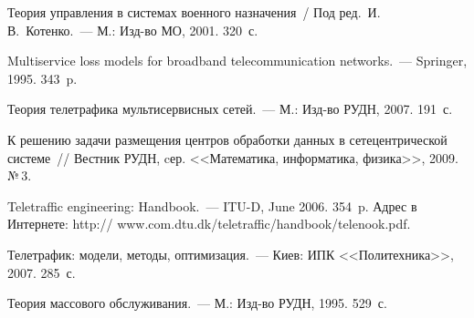 \begin{multicols}{2}
{{\begin{thebibliography}{99}
  Теория управления в системах военного назначения~/ Под ред.\ 
И.\,В.~Котенко.~--- М.: Изд-во МО, 2001. 320~с.
  
  Multiservice loss models for broadband telecommunication networks.~--- 
Springer, 1995. 343~p.
  
  Теория телетрафика мультисервисных сетей.~--- М.: Изд-во РУДН, 2007. 
191~с.
  
  К решению задачи размещения центров обработки 
данных в сетецентрической системе~// Вестник РУДН, cер. <<Математика, 
информатика, физика>>, 2009. №\,3.
  
  
  Teletraffic engineering: Handbook.~--- \mbox{ITU-D}, June 2006. 354~p. Адрес в 
Интернете: {\sf http:// www.com.dtu.dk/teletraffic/handbook/telenook.pdf}.

  \label{end\stat}

  Телетрафик: модели, методы, оптимизация.~--- Киев: ИПК 
<<Политехника>>, 2007. 285~с.
  
  Теория массового обслуживания.~--- М.: Изд-во РУДН, 1995. 529~с.
 \end{thebibliography}
}
}
\end{multicols} 
 
 
 
 